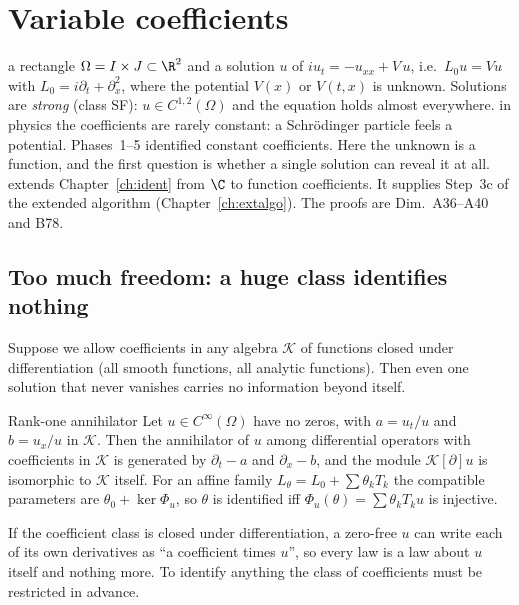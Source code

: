 \chapter{Variable coefficients}\label{ch:varcoef}
\chapterbrief
{a rectangle $\Omega=I\times J\subset\R^2$ and a solution $u$ of $iu_t=-u_{xx}+V\,u$, i.e.\ $L_0u=Vu$ with $L_0=i\partial_t+\partial_x^2$, where the potential $V(x)$ or $V(t,x)$ is unknown. Solutions are \emph{strong} (class SF): $u\in C^{1,2}(\Omega)$ and the equation holds almost everywhere.}
{in physics the coefficients are rarely constant: a Schr\"odinger particle feels a potential. Phases~1--5 identified constant coefficients. Here the unknown is a function, and the first question is whether a single solution can reveal it at all.}
{extends Chapter~\ref{ch:ident} from $\C$ to function coefficients. It supplies Step~3c of the extended algorithm (Chapter~\ref{ch:extalgo}). The proofs are Dim.~A36--A40 and B78.}

\section{Too much freedom: a huge class identifies nothing}

Suppose we allow coefficients in any algebra $\mathcal K$ of functions closed under differentiation (all smooth functions, all analytic functions). Then even one solution that never vanishes carries no information beyond itself.

\begin{theorem}{Rank-one annihilator  \proved}\label{thm:varn1}
Let $u\in C^\infty(\Omega)$ have no zeros, with $a=u_t/u$ and $b=u_x/u$ in $\mathcal K$. Then the annihilator of $u$ among differential operators with coefficients in $\mathcal K$ is generated by $\partial_t-a$ and $\partial_x-b$, and the module $\mathcal K[\partial]u$ is isomorphic to $\mathcal K$ itself. For an affine family $L_\theta=L_0+\sum\theta_kT_k$ the compatible parameters are $\theta_0+\ker\Phi_u$, so $\theta$ is identified iff $\Phi_u(\theta)=\sum\theta_kT_ku$ is injective.
\end{theorem}

\begin{intuition}
If the coefficient class is closed under differentiation, a zero-free $u$ can write each of its own derivatives as ``a coefficient times $u$'', so every law is a law about $u$ itself and nothing more. To identify anything the class of coefficients must be restricted in advance.
\end{intuition}

